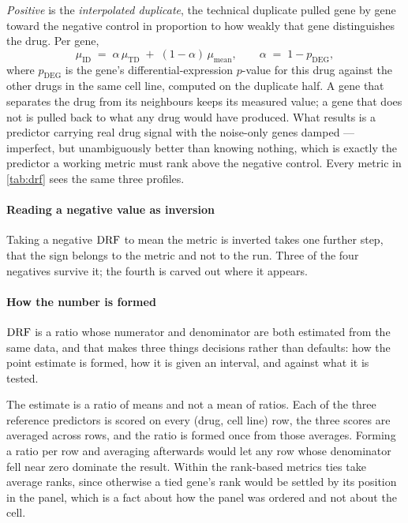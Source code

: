 \emph{Positive} is the \emph{interpolated duplicate}, the technical duplicate
pulled gene by gene toward the negative control in proportion to how weakly that
gene distinguishes the drug. Per gene,
\begin{equation}
 \mu_{\textrm{ID}} \;=\; \alpha\,\mu_{\textrm{TD}}
 \;+\; (1-\alpha)\,\mu_{\textrm{mean}} ,
 \qquad \alpha \;=\; 1 - p_{\textrm{DEG}} ,
\end{equation}
where $p_{\textrm{DEG}}$ is the gene's differential-expression $p$-value for this
drug against the other drugs in the same cell line, computed on the duplicate
half. A gene that separates the drug from its neighbours keeps its measured
value; a gene that does not is pulled back to what any drug would have produced.
What results is a predictor carrying real drug signal with the noise-only genes
damped --- imperfect, but unambiguously better than knowing nothing, which is
exactly the predictor a working metric must rank above the negative control.
Every metric in \cref{tab:drf} sees the same three profiles.

\paragraph{Reading a negative value as inversion} Taking a negative $\textrm{DRF}$ to
mean the metric is inverted takes one further step, that the sign belongs to the
metric and not to the run. Three of the four negatives survive it; the fourth is carved out where it
appears.

\paragraph{How the number is formed} $\textrm{DRF}$ is a ratio whose numerator and
denominator are both estimated from the same data, and that makes three things
decisions rather than defaults: how the point estimate is formed, how it is given
an interval, and against what it is tested.

The estimate is a ratio of means and not a mean of ratios. Each of the three
reference predictors is scored on every (drug, cell line) row, the three scores
are averaged across rows, and the ratio is formed once from those averages.
Forming a ratio per row and averaging afterwards would let any row whose
denominator fell near zero dominate the result. Within the rank-based metrics
ties take average ranks, since otherwise a tied gene's rank would be settled by
its position in the panel, which is a fact about how the panel was ordered and
not about the cell.

